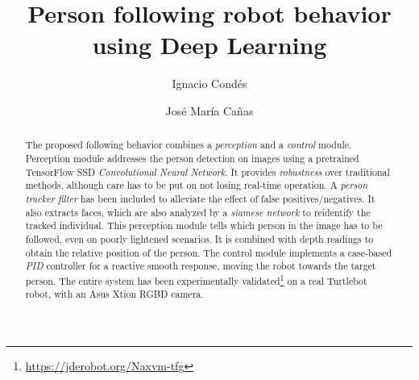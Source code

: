 \documentclass[11pt, a4paper]{svproc}
\title{Person following robot behavior using Deep Learning}
\author{Ignacio Condés\inst{1} \and José María Cañas\inst{2}}
\institute{Universidad Rey Juan Carlos,
	\email{ignacio.condes.m@gmail.com},
	\and
Universidad Rey Juan Carlos, \email{jmplaza@gsyc.es}}
\begin{document}
	\maketitle
	
	\begin{abstract}
		The proposed following behavior combines a \emph{perception} and a \emph{control} module. Perception module addresses the person detection on images using a pretrained TensorFlow SSD \emph{Convolutional Neural Network}. It provides \emph{robustness} over traditional methods, although care has to be put on not losing real-time operation. A \emph{person tracker filter} has been included to alleviate the effect of false positives/negatives. It also extracts faces, which are also analyzed by a \emph{siamese network} to reidentify the tracked individual. This perception module tells which person in the image has to be followed, even on poorly lightened scenarios. It is combined with depth readings to obtain the relative position of the person. The control module implements a case-based \emph{PID} controller for a reactive smooth response, moving the robot towards the target person. The entire system has been experimentally validated\footnote{\url{https://jderobot.org/Naxvm-tfg}} on a real Turtlebot robot, with an Asus Xtion RGBD camera.
	\end{abstract}

	
	
\end{document}
